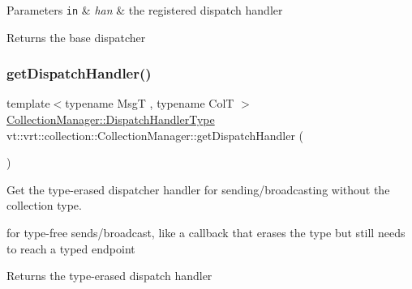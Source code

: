 \begin{DoxyParams}[1]{Parameters}
\mbox{\tt in}  & {\em han} & the registered dispatch handler\\
\hline
\end{DoxyParams}
\begin{DoxyReturn}{Returns}
the base dispatcher 
\end{DoxyReturn}
\mbox{\label{structvt_1_1vrt_1_1collection_1_1_collection_manager_ab672ad6c3bc9fdc5a9577a9ae0677d1f}} 
\subsubsection{\texorpdfstring{get\+Dispatch\+Handler()}{getDispatchHandler()}}
{\footnotesize\ttfamily template$<$typename MsgT , typename ColT $>$ \\
\hyperlink{structvt_1_1vrt_1_1collection_1_1_collection_manager_a0cfe02a0426e95ec9daa2ef7374e07c7}{Collection\+Manager\+::\+Dispatch\+Handler\+Type} vt\+::vrt\+::collection\+::\+Collection\+Manager\+::get\+Dispatch\+Handler (\begin{DoxyParamCaption}{ }\end{DoxyParamCaption})}



Get the type-\/erased dispatcher handler for sending/broadcasting without the collection type. 

for type-\/free sends/broadcast, like a callback that erases the type but still needs to reach a typed endpoint

\begin{DoxyReturn}{Returns}
the type-\/erased dispatch handler 
\end{DoxyReturn}
\mbox{\label{structvt_1_1vrt_1_1collection_1_1_collection_manager_a7db90d5e08077593edbff643b579c2cb}} 
